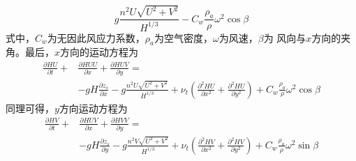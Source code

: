                                                         \begin{equation}
                                                          g\frac{n^{2}U\sqrt{U^{2}+V^{2}}}{H^{1/3}}
                                                          -
                                                          C_{w}\frac{\rho_{a}}{\rho}\omega^{2}\cos\beta
                                                          \label{EqCGe_Shear}
                                                        \end{equation}
                                                        式中，$C_{w}$为无因此风应力系数，$\rho_{a}$为空气密度，$\omega$为风速，$\beta$为
                                                        风向与$x$方向的夹角。最后，$x$方向的运动方程为
                                                        \begin{equation}
                                                          \begin{aligned}
                                                            \frac{\partial HU}{\partial t} +
  &\frac{\partial HUU}{\partial x} +
  \frac{\partial HUV}{\partial y}
  =\\
  &-gH\frac{\partial  z_{s}}{\partial x}
  -g\frac{n^{2}U\sqrt{U^{2}+V^{2}}}{H^{1/3}}
  +
  \nu_{t}\left(
    \frac{\partial^{2}HU}{\partial x^{2}}+
    \frac{\partial^{2}HU}{\partial y^{2}}
  \right)
  +C_{w}\frac{\rho_{a}}{\rho}\omega^{2}\cos\beta
                                                          \end{aligned}
                                                          \label{EqCGe_Me_x}
                                                        \end{equation}
                                                        同理可得，$y$方向运动方程为
                                                        \begin{equation}
                                                          \begin{aligned}
                                                            \frac{\partial HV}{\partial t} +
  &\frac{\partial HUV}{\partial x} +
  \frac{\partial HVV}{\partial y}
  =\\
  &-gH\frac{\partial  z_{s}}{\partial y}
  -g\frac{n^{2}V\sqrt{U^{2}+V^{2}}}{H^{1/3}}
  +
  \nu_{t}\left(
    \frac{\partial^{2}HV}{\partial x^{2}}+
    \frac{\partial^{2}HV}{\partial y^{2}}
  \right)
  +C_{w}\frac{\rho_{a}}{\rho}\omega^{2}\sin\beta
                                                          \end{aligned}
                                                          \label{EqCGe_Me_y}
                                                        \end{equation}

